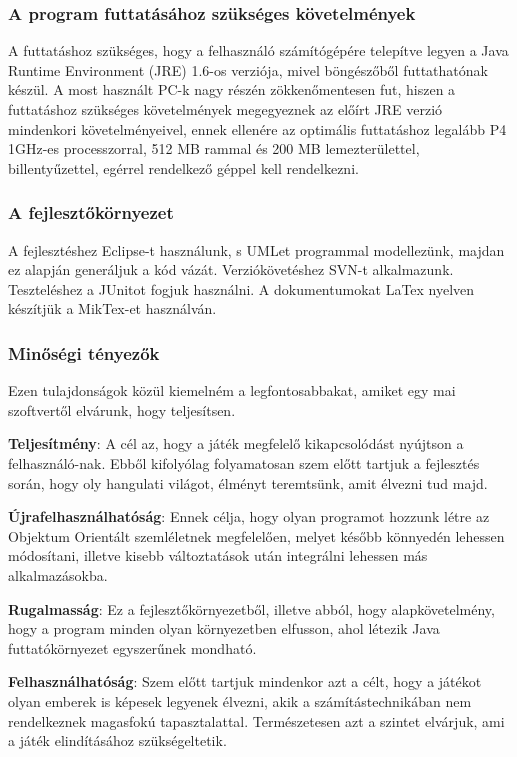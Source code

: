 \subsubsection{A program futtatásához szükséges követelmények}

A futtatáshoz szükséges, hogy a felhasználó számítógépére telepítve legyen a Java Runtime Environment (JRE) 1.6-os verziója, mivel böngészőből futtathatónak készül. A most használt PC-k nagy részén zökkenőmentesen fut, hiszen a futtatáshoz szükséges követelmények megegyeznek az előírt JRE verzió mindenkori követelményeivel, ennek ellenére az optimális futtatáshoz legalább P4 1GHz-es processzorral, 512 MB rammal és 200 MB lemezterülettel, billentyűzettel, egérrel rendelkező géppel kell rendelkezni.

\subsubsection{A fejlesztőkörnyezet}

A fejlesztéshez Eclipse-t használunk, s UMLet programmal modellezünk, majdan ez alapján generáljuk a kód vázát. Verziókövetéshez SVN-t alkalmazunk.  Teszteléshez a JUnitot fogjuk használni. A dokumentumokat LaTex nyelven készítjük a MikTex-et használván.

\subsubsection{Minőségi tényezők}

Ezen tulajdonságok közül kiemelném a legfontosabbakat, amiket egy mai szoftvertől elvárunk, hogy teljesítsen.

\textbf{Teljesítmény}: A cél az, hogy a játék megfelelő kikapcsolódást nyújtson a felhasználó-nak. Ebből kifolyólag folyamatosan szem előtt tartjuk a fejlesztés során, hogy oly hangulati világot, élményt teremtsünk, amit élvezni tud majd.

\textbf{Újrafelhasználhatóság}: Ennek célja, hogy olyan programot hozzunk létre az Objektum Orientált szemléletnek megfelelően, melyet később könnyedén lehessen módosítani, illetve kisebb változtatások után integrálni lehessen más alkalmazásokba.

\textbf{Rugalmasság}: Ez a fejlesztőkörnyezetből, illetve abból, hogy alapkövetelmény, hogy a program minden olyan környezetben elfusson, ahol létezik Java futtatókörnyezet egyszerűnek mondható.

\textbf{Felhasználhatóság}: Szem előtt tartjuk mindenkor azt a célt, hogy a játékot olyan emberek is képesek legyenek élvezni, akik a számítástechnikában nem rendelkeznek magasfokú tapasztalattal. Természetesen azt a szintet elvárjuk, ami a játék elindításához szükségeltetik.

